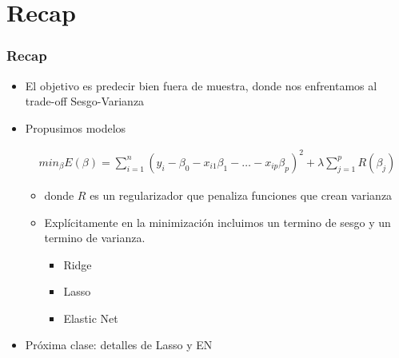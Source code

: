 \documentclass[
  shownotes,
  xcolor={svgnames},
  hyperref={colorlinks,citecolor=DarkBlue,linkcolor=andesred,urlcolor=DarkBlue}
  , aspectratio=169]{beamer}
\begin{document}
\section{Recap}
\begin{frame}[fragile]
\frametitle{Recap}

\begin{itemize}

    \item El objetivo es predecir bien fuera de muestra, donde nos enfrentamos al trade-off Sesgo-Varianza
    
    \medskip
    \item Propusimos modelos


    \begin{align}
        min_{\beta} E(\beta) = \sum_{i=1}^n (y_i-\beta_0 - x_{i1}\beta_1 - \dots - x_{ip}\beta_p)^2 + \lambda \sum_{j=1}^p R(\beta_j)
    \end{align}
    \begin{itemize}
    \item donde $R$ es un regularizador que penaliza funciones que crean varianza
    \medskip
    \item Explícitamente en la minimización incluimos un termino de sesgo y un termino de varianza.
        

    \medskip
        \begin{itemize}
            \item Ridge
            \medskip
            \item Lasso
            \medskip
            \item Elastic Net
        \end{itemize}
\end{itemize}

  
    \item Próxima clase: detalles de Lasso y EN
 
\end{itemize}
 

 \end{frame}


\end{document}
